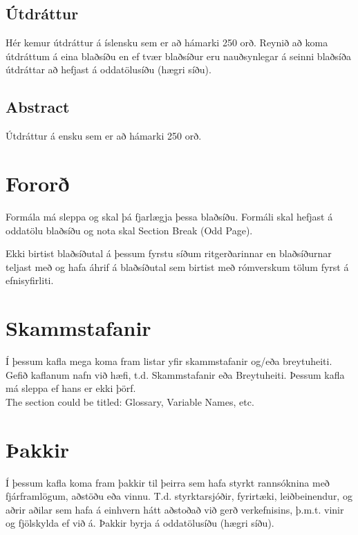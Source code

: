 \documentclass[a4paper,12pt,twoside,BCOR=10mm]{scrbook}
\begin{document}

\setcounter{page}{5}
\section*{\huge Útdráttur}
Hér kemur útdráttur á íslensku sem er að hámarki 250 orð. Reynið að koma útdráttum á eina blaðsíðu en ef tvær blaðsíður eru nauðsynlegar á seinni blaðsíða útdráttar að hefjast á oddatölusíðu (hægri síðu).
\vfill

\section*{\huge Abstract}
Útdráttur á ensku sem er að hámarki 250 orð.
\vfill \vspace*{1cm}

\newpage

\chapter*{Fororð}
Formála má sleppa og skal þá fjarlægja þessa blaðsíðu. Formáli skal hefjast á oddatölu blaðsíðu og nota skal Section Break (Odd Page).

Ekki birtist blaðsíðutal á þessum fyrstu síðum ritgerðarinnar en blaðsíðurnar teljast með og hafa áhrif á blaðsíðutal sem birtist með rómverskum tölum fyrst á efnisyfirliti.

\tableofcontents
\listoffigures
\listoftables

\chapter*{Skammstafanir}
Í þessum kafla mega koma fram listar yfir skammstafanir og/eða breytuheiti. Gefið kaflanum nafn við hæfi, t.d. Skammstafanir eða Breytuheiti. Þessum kafla má sleppa ef hans er ekki þörf. \\

The section could be titled: Glossary, Variable Names, etc.

\chapter*{Þakkir}
Í þessum kafla koma fram þakkir til þeirra sem hafa styrkt rannsóknina með fjárframlögum, aðstöðu eða vinnu. T.d. styrktarsjóðir, fyrirtæki, leiðbeinendur, og aðrir aðilar sem hafa á einhvern hátt aðstoðað við gerð verkefnisins, þ.m.t. vinir og fjölskylda ef við á. Þakkir byrja á oddatölusíðu (hægri síðu).
\end{document}

